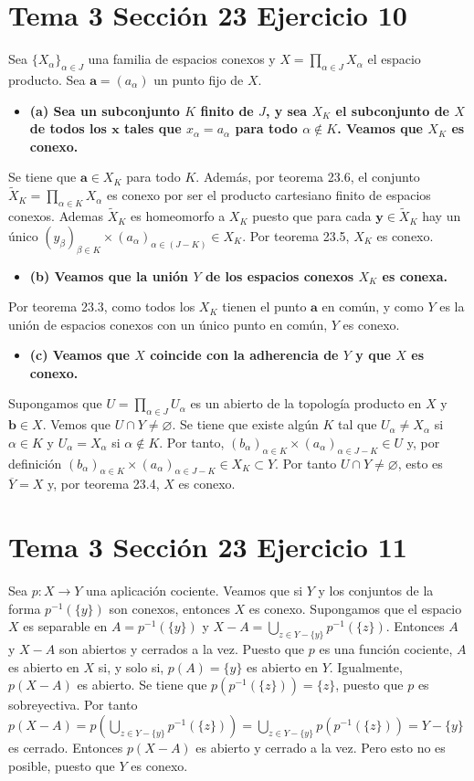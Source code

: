 \documentclass{article}
\newcommand{\vect}[1]{\boldsymbol{#1}}
\begin{document}
\section{Tema 3 Sección 23 Ejercicio 10}
Sea $\{X_\alpha\}_{\alpha\in J}$ una familia de espacios conexos y $X=\prod_{\alpha\in J}X_\alpha$ el espacio producto. Sea $\vect{a}=(a_\alpha)$ un punto fijo de $X$.
\begin{itemize}
\item \bf (a) \rm Sea un subconjunto $K$ finito de $J$, y sea $X_K$ el subconjunto de $X$ de todos los $\vect{x}$ tales que $x_\alpha=a_\alpha$ para todo $\alpha\notin K$. Veamos que $X_K$ es conexo.
\end{itemize}
Se tiene que $\vect{a}\in X_K$ para todo $K$. Además, por teorema 23.6, el conjunto $\widetilde{X}_K=\prod_{\alpha\in K}X_\alpha$ es conexo por ser el producto cartesiano finito de espacios conexos. Ademas $\widetilde{X}_K$ es homeomorfo a $X_K$ puesto que para cada $\vect{y}\in \widetilde{X}_K$ hay un único  $(y_\beta)_{\beta\in K}\times (a_\alpha)_{\alpha\in (J-K)}\in X_K$. Por teorema 23.5, 
$X_K$ es conexo.
\begin{itemize}
\item \bf (b) \rm Veamos que la unión $Y$ de los espacios conexos  $X_K$ es conexa.
\end{itemize}
Por teorema 23.3, como todos los $X_K$ tienen el punto $\vect{a}$ en común, y como $Y$ es la unión de espacios conexos con un único punto en común, $Y$ es conexo.
\begin{itemize}
\item \bf (c) \rm Veamos que $X$ coincide con la adherencia de $Y$ y que $X$ es conexo.
\end{itemize}
Supongamos que $U=\prod_{\alpha\in J}U_\alpha$ es un abierto de la topología producto en $X$ y $\vect{b}\in X$. Vemos que $U\cap Y\neq \varnothing$. Se tiene que existe algún $K$ tal que $ U_\alpha\neq X_\alpha$ si $\alpha \in K $ y $ U_\alpha=X_\alpha$ si $\alpha\notin K$. Por tanto, $(b_\alpha)_{\alpha\in K}\times (a_\alpha)_{\alpha\in J-K}\in U$ y, por definición $(b_\alpha)_{\alpha\in K}\times (a_\alpha)_{\alpha\in J-K}\in X_K\subset Y$. Por tanto $U\cap Y\neq \varnothing$, esto es $\overline{Y}=X$ y, por teorema 23.4, $X$ es conexo.
\section{Tema 3 Sección 23 Ejercicio 11}
Sea $p:X\rightarrow Y$ una aplicación cociente. Veamos que si $Y$ y los conjuntos de la forma $p^{-1}(\{y\})$ son conexos, entonces $X$ es conexo. Supongamos que el espacio $X$ es separable en $A=p^{-1}(\{y\})$ y $X-A=\bigcup_{z\in Y-\{y\}}p^{-1}(\{z\})$. Entonces $A$ y $X-A$ son abiertos y cerrados a la vez. Puesto que $p$ es una función cociente, $A$ es abierto en $X$ si, y solo si, $p(A)=\{y\}$ es abierto en $Y$. Igualmente, $p(X-A)$ es abierto. Se tiene que $p(p^{-1}(\{z\}))=\{z\}$, puesto que $p$ es sobreyectiva. Por tanto $p(X-A)=p(\bigcup_{z\in Y-\{y\}}p^{-1}(\{z\}))=\bigcup_{z\in Y-\{y\}}p(p^{-1}(\{z\}))=Y-\{y\}$ es cerrado. Entonces $p(X-A)$ es abierto y cerrado a la vez. Pero esto no es posible, puesto que $Y$ es conexo.
\end{document}
